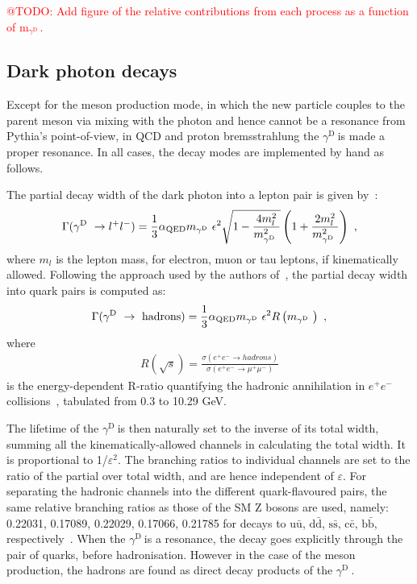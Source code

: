 \documentclass[12pt,a4paper]{article}
\newcommand{\mathDP}{\gamma^{\mathrm{D}}\ }
\newcommand{\DP}{$\mathDP$}
\newcommand{\mDP}{m$_{\mathDP}$}
\begin{document}
\textcolor{red}{@TODO: Add figure of the relative contributions from each process as a function of \mDP.}


\subsection{Dark photon decays}
\label{sec:decay}

Except for the meson production mode, in which the new particle
couples to the parent meson via mixing with the photon and hence
cannot be a resonance from Pythia's point-of-view, in QCD and proton
bremsstrahlung the \DP is made a proper resonance. In all cases, the
decay modes are implemented by hand as follows.

The partial decay width of the dark photon into a lepton pair is given by~\cite{Blumlein:2013cua}:
\begin{align}
	\Gamma(\mathDP \rightarrow l^+ l^-) = \frac{1}{3} \alpha_{\rm QED} m_{\mathDP} \epsilon^2 \sqrt{1 - \frac{4 m_l^2}{m_{\mathDP}^2}}\left(1 + \frac{2 m_l^2}{m_{\mathDP}^2}\right)~,\label{eq:dp-decay}
\end{align}
where $m_l$ is the lepton mass, for electron, muon or tau leptons, if
kinematically allowed. Following the approach used by the authors
of~\cite{Bjorken:2009mm}, the partial decay width into quark pairs is
computed as:
\begin{align}
	\Gamma(\mathDP \rightarrow~\text{hadrons}) = \frac{1}{3} \alpha_{\rm QED} m_{\mathDP} \epsilon^2 
	R\left(m_{\mathDP}\right)~,
\end{align}
where
\begin{align}
	R\left(\sqrt{s}\right) = \frac{\sigma(e^+e^- \rightarrow hadrons)}{\sigma(e^+e^- \rightarrow \mu^+\mu^-)}
\end{align}
is the energy-dependent R-ratio quantifying the hadronic annihilation
in $e^+e^-$ collisions~\cite{Agashe:2014kda}, tabulated from 0.3 to
10.29 GeV.


The lifetime of the \DP is then naturally set to the inverse of its
total width, summing all the kinematically-allowed channels in
calculating the total width. It is proportional to
1/$\varepsilon^2$. The branching ratios to individual channels are set
to the ratio of the partial over total width, and are hence
independent of $\varepsilon$. For separating the hadronic channels
into the different quark-flavoured pairs, the same relative branching
ratios as those of the SM Z bosons are used, namely: 0.22031,
0.17089, 0.22029, 0.17066, 0.21785 for decays to
$\mathrm{u}\bar{\mathrm{u}}$, $\mathrm{d}\bar{\mathrm{d}}$, $\mathrm{s}\bar{\mathrm{s}}$,
$\mathrm{c}\bar{\mathrm{c}}$, $\mathrm{b}\bar{\mathrm{b}}$,
respectively~\cite{Sjostrand:2014zea}. When the \DP is a resonance,
the decay goes explicitly through the pair of quarks, before
hadronisation. However in the case of the meson production, the
hadrons are found as direct decay products of the \DP.
\end{document}
